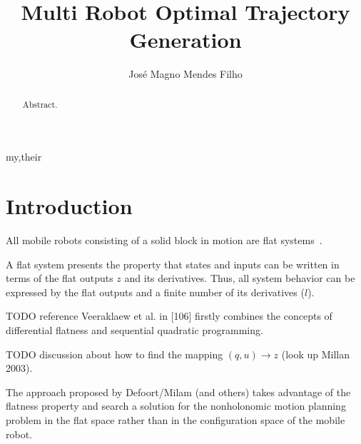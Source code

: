 \documentclass[eprint]{actapoly}
\begin{document}
\title[Trajectory Generation Approach]
{Multi Robot Optimal Trajectory Generation}

\author[J. M. Mendes Filho]{Jos\'{e} Magno Mendes Filho}{my,their}


\begin{abstract}
 Abstract.
\end{abstract}


\maketitle




\section{Introduction}




All mobile robots consisting of a solid block in motion are flat systems~\cite{Defoort2007a}.

A flat system presents the property that states and inputs can be written in terms of the flat outputs $z$ and its derivatives.
Thus, all system behavior can be expressed by the flat outputs and a finite number of its derivatives ($l$).

TODO reference Veeraklaew et al. in [106] firstly combines the concepts of differential flatness and sequential quadratic programming.

TODO discussion about how to find the mapping $(q, u) \rightarrow z$ (look up Millan 2003).

The approach proposed by Defoort/Milam (and others) takes advantage of the flatness property and search a solution for
the nonholonomic motion planning problem in the flat space rather than in the configuration space of the mobile robot.
\end{document}
